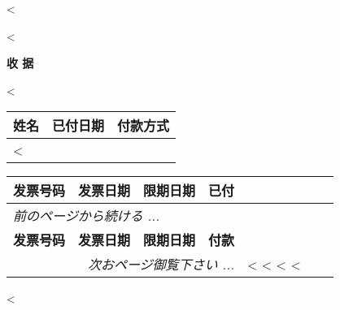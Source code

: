 <%


\begin{CJK}{UTF8}{arialuni}

\vspace*{-3.3cm}
<%
\vspace*{1.5cm}

\centerline{\large\bf{收 据}}

\vspace*{0.5cm}

\parbox[t]{.45\textwidth}{
\vspace{0.3cm}
<%
}

\vspace{0.5cm}

\begin{tabularx}{\textwidth}{*{3}{|X}|} \hline
  \textbf{姓名} & \textbf{已付日期} & \textbf{付款方式} \\ 
  \hline
	<%
  \hline
\end{tabularx}

\vspace{0.5cm}

\begin{longtable}{|l p{5.5cm} @{\extracolsep\fill} rr|} \hline
\xstrut
  \textbf{发票号码} & \textbf{发票日期} & \textbf{限期日期} & \textbf{已付} \\     
  \hline
\endfirsthead
  \multicolumn{3}{l}{\emph{前のページから続ける ...}} \\
  \hline
  \textbf{发票号码} & \textbf{发票日期} & \textbf{限期日期} & \textbf{付款} \\     
  \hline
\endhead
   \hline \multicolumn{4}{r}{\emph{次おページ御覧下さい ...}}
\endfoot
   \hline
   \multicolumn{3}{|lr} \textbf{总额} & <%
	\hline
\endlastfoot
<%
  <%
<%
\end{longtable}

\vspace{1cm}

<%

\vfill
\end{CJK}
